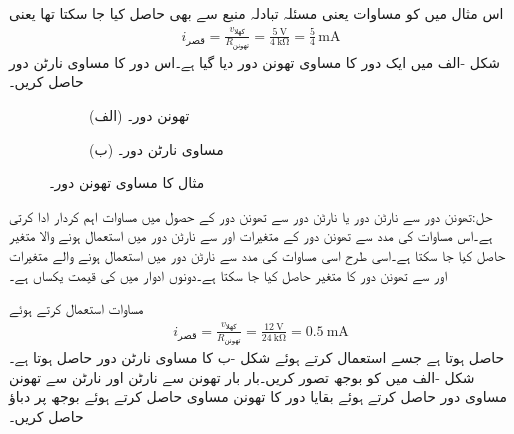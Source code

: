 اس مثال میں  کو مساوات  یعنی مسئلہ تبادلہ منبع سے بھی حاصل کیا جا سکتا تھا یعنی
\begin{align*}
i_{\text{قصر}}=\frac{v_{\text{کھلا}}}{R_{\text{تھونن}}}=\frac{\SI{5}{\volt}}{\SI{4}{\kilo\ohm}}=\frac{5}{4} \, \si{\milli\ampere}
\end{align*}
شکل -الف میں ایک دور کا مساوی تھونن دور دیا گیا ہے۔اس دور کا مساوی نارٹن دور حاصل کریں۔
\begin{figure}
\centering
\begin{subfigure}{0.5\textwidth}
\centering
{}
\caption*{(الف) تھونن دور۔}
\end{subfigure}%
\begin{subfigure}{0.5\textwidth}
\centering
{}
\caption*{(ب) مساوی نارٹن دور۔}
\end{subfigure}%
\caption{مثال  کا مساوی تھونن دور۔}
\label{شکل_مثال_تھونن_سے_نارٹن_الف}
\end{figure}

حل:تھونن دور سے نارٹن دور یا نارٹن دور سے تھونن دور کے حصول میں مساوات  اہم کردار ادا کرتی ہے۔اس مساوات کی مدد سے  تھونن دور کے متغیرات   اور  سے نارٹن دور میں استعمال ہونے والا متغیر  حاصل کیا جا سکتا ہے۔اسی طرح اسی مساوات کی مدد سے نارٹن دور میں استعمال ہونے والے متغیرات  اور    سے تھونن دور کا متغیر   حاصل کیا جا سکتا ہے۔دونوں ادوار میں  کی قیمت یکساں ہے۔

مساوات  استعمال کرتے ہوئے
\begin{align*}
i_{\text{قصر}} = \frac{v_{\text{کھلا}}}{R_{\text{تھونن}}}=\frac{\SI{12}{\volt}}{\SI{24}{\kilo\ohm}}=\SI{0.5}{\milli\ampere}
\end{align*}
حاصل ہوتا ہے جسے استعمال کرتے ہوئے  شکل -ب کا مساوی نارٹن دور حاصل ہوتا ہے۔ 
شکل -الف میں  کو بوجھ تصور کریں۔بار بار تھونن سے نارٹن اور نارٹن سے تھونن مساوی دور حاصل کرتے ہوئے بقایا دور کا  تھونن مساوی حاصل کرتے ہوئے بوجھ پر دباؤ حاصل کریں۔

